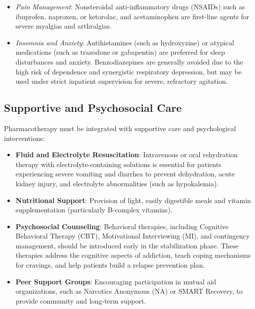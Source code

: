 \begin{itemize}
\begin{itemize}
        \item \textit{Pain Management}: Nonsteroidal anti-inflammatory drugs (NSAIDs) such as ibuprofen, naproxen, or ketorolac, and acetaminophen are first-line agents for severe myalgias and arthralgias.
        \item \textit{Insomnia and Anxiety}: Antihistamines (such as hydroxyzine) or atypical medications (such as trazodone or gabapentin) are preferred for sleep disturbances and anxiety. Benzodiazepines are generally avoided due to the high risk of dependence and synergistic respiratory depression, but may be used under strict inpatient supervision for severe, refractory agitation.
    \end{itemize}
\end{itemize}

\subsection*{Supportive and Psychosocial Care}
Pharmacotherapy must be integrated with supportive care and psychological interventions:
\begin{itemize}
    \item \textbf{Fluid and Electrolyte Resuscitation}: Intravenous or oral rehydration therapy with electrolyte-containing solutions is essential for patients experiencing severe vomiting and diarrhea to prevent dehydration, acute kidney injury, and electrolyte abnormalities (such as hypokalemia).
    \item \textbf{Nutritional Support}: Provision of light, easily digestible meals and vitamin supplementation (particularly B-complex vitamins).
    \item \textbf{Psychosocial Counseling}: Behavioral therapies, including Cognitive Behavioral Therapy (CBT), Motivational Interviewing (MI), and contingency management, should be introduced early in the stabilization phase. These therapies address the cognitive aspects of addiction, teach coping mechanisms for cravings, and help patients build a relapse prevention plan.
    \item \textbf{Peer Support Groups}: Encouraging participation in mutual aid organizations, such as Narcotics Anonymous (NA) or SMART Recovery, to provide community and long-term support.
\end{itemize}

